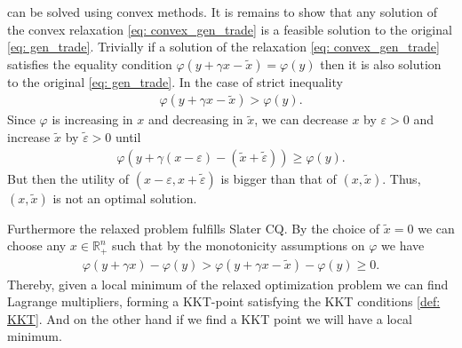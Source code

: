 can be solved using convex methods. It is remains to show that any solution
of the convex relaxation \ref{eq: convex_gen_trade} is a feasible solution to
the original \ref{eq: gen_trade}. Trivially if a solution of the relaxation
\ref{eq: convex_gen_trade} satisfies the equality condition $\varphi(y +
\gamma x - \tilde{x}) = \varphi(y)$ then it is also solution to the original
\ref{eq: gen_trade}. In the case of strict inequality
\begin{align}
    \varphi(y + \gamma x - \tilde{x}) > \varphi(y).
\end{align}
Since $\varphi$ is increasing in $x$ and decreasing in $\tilde{x}$, we
can decrease $x$ by $\varepsilon>0$ and increase $\tilde{x}$ by
$\tilde{\varepsilon}>0$ until
\begin{align}
    \varphi(y + \gamma (x-\varepsilon) - (\tilde{x}+\tilde{\varepsilon})) \ge \varphi(y).
\end{align}
But then the utility of $(x-\varepsilon, x+\tilde{\varepsilon})$ is bigger
than that of $(x,\tilde{x})$. Thus, $(x,\tilde{x})$ is not an optimal
solution.
\newline

Furthermore the relaxed problem fulfills Slater CQ. By the choice of
$\tilde{x}=0$ we can choose any $x \in \mathbb{R}^{n}_+$ such that by the
monotonicity assumptions on $\varphi$ we have
\begin{align}
    \varphi(y +\gamma x) - \varphi(y) > \varphi(y + \gamma x - \tilde{x}) -
    \varphi(y) \ge 0.
\end{align}
Thereby, given a local minimum of the relaxed optimization problem we can find
Lagrange multipliers, forming a KKT-point satisfying the KKT conditions
\ref{def: KKT}. And on the other hand if we find a KKT point we will have a
local minimum.

